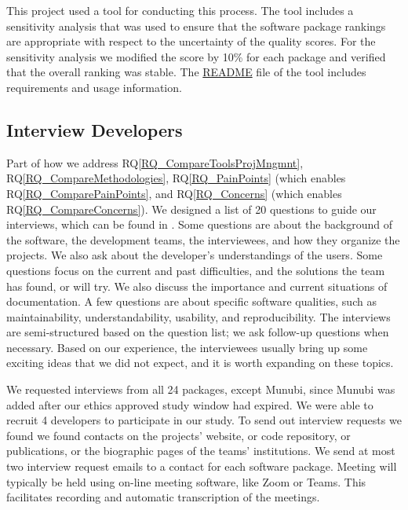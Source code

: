 \documentclass[final, 3p, times, authoryear]{elsarticle}
\newcommand{\rqref}[1]{RQ\ref{#1}}
\begin{document}
This project used a tool for conducting this process. The tool includes a
sensitivity analysis that was used to ensure that the software package rankings
are appropriate with respect to the uncertainty of the quality scores. For the
sensitivity analysis we modified the score by 10\% for each package and verified
that the overall ranking was stable.  The
\href{https://github.com/smiths/AIMSS/blob/master/StateOfPractice/AHP2020/LBM/README.txt}{README}
file of the tool includes requirements and usage information.

\subsection{Interview Developers} \label{SecSurvey}

Part of how we address \rqref{RQ_CompareToolsProjMngmnt},
\rqref{RQ_CompareMethodologies}, \rqref{RQ_PainPoints} (which enables
\rqref{RQ_ComparePainPoints}, and \rqref{RQ_Concerns} (which enables
\rqref{RQ_CompareConcerns}). We designed a list of 20 questions to guide our
interviews, which can be found in \citet{SmithEtAl2021}. Some questions are
about the background of the software, the development teams, the interviewees,
and how they organize the projects. We also ask about the developer's
understandings of the users. Some questions focus on the current and past
difficulties, and the solutions the team has found, or will try. We also discuss
the importance and current situations of documentation. A few questions are
about specific software qualities, such as maintainability, understandability,
usability, and reproducibility. The interviews are semi-structured based on the
question list; we ask follow-up questions when necessary. Based on our
experience, the interviewees usually bring up some exciting ideas that we did
not expect, and it is worth expanding on these topics.

We requested interviews from all 24 packages, except Munubi, since Munubi was
added after our ethics approved study window had expired.  We were able to
recruit 4 developers to participate in our study.  To send out interview
requests we found we found contacts on the projects' website, or code
repository, or publications, or the biographic pages of the teams'
institutions. We send at most two interview request emails to a contact for each
software package.  Meeting will typically be held using on-line meeting
software, like Zoom or Teams.  This facilitates recording and automatic
transcription of the meetings.
\end{document}
